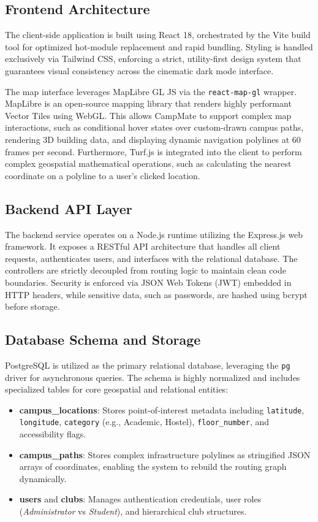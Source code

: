 \documentclass[conference]{IEEEtran}
\begin{document}
\subsection{Frontend Architecture}
The client-side application is built using React 18, orchestrated by the Vite build tool for optimized hot-module replacement and rapid bundling. Styling is handled exclusively via Tailwind CSS, enforcing a strict, utility-first design system that guarantees visual consistency across the cinematic dark mode interface. 

The map interface leverages MapLibre GL JS via the \texttt{react-map-gl} wrapper. MapLibre is an open-source mapping library that renders highly performant Vector Tiles using WebGL. This allows CampMate to support complex map interactions, such as conditional hover states over custom-drawn campus paths, rendering 3D building data, and displaying dynamic navigation polylines at 60 frames per second. Furthermore, Turf.js is integrated into the client to perform complex geospatial mathematical operations, such as calculating the nearest coordinate on a polyline to a user's clicked location.

\subsection{Backend API Layer}
The backend service operates on a Node.js runtime utilizing the Express.js web framework. It exposes a RESTful API architecture that handles all client requests, authenticates users, and interfaces with the relational database. The controllers are strictly decoupled from routing logic to maintain clean code boundaries. Security is enforced via JSON Web Tokens (JWT) embedded in HTTP headers, while sensitive data, such as passwords, are hashed using bcrypt before storage.

\subsection{Database Schema and Storage}
PostgreSQL is utilized as the primary relational database, leveraging the \texttt{pg} driver for asynchronous queries. The schema is highly normalized and includes specialized tables for core geospatial and relational entities:
\begin{itemize}
    \item \textbf{campus\_locations}: Stores point-of-interest metadata including \texttt{latitude}, \texttt{longitude}, \texttt{category} (e.g., Academic, Hostel), \texttt{floor\_number}, and accessibility flags.
    \item \textbf{campus\_paths}: Stores complex infrastructure polylines as stringified JSON arrays of coordinates, enabling the system to rebuild the routing graph dynamically.
    \item \textbf{users} and \textbf{clubs}: Manages authentication credentials, user roles (\textit{Administrator} vs \textit{Student}), and hierarchical club structures.
\end{itemize}
\end{document}
